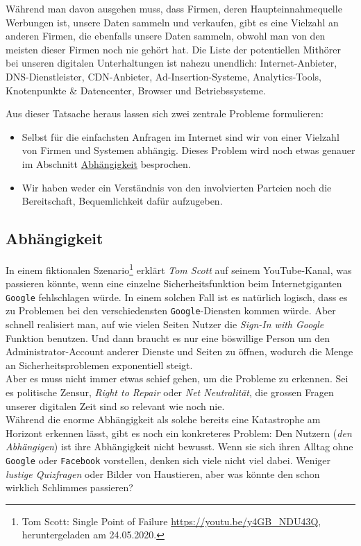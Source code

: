 \documentclass[a4paper,11pt,titlepage,twoside]{memoir}
\begin{document}
\noindent Während man davon ausgehen muss, dass Firmen, deren
Haupteinnahmequelle Werbungen ist, unsere Daten sammeln und verkaufen,
gibt es eine Vielzahl an anderen Firmen, die ebenfalls unsere Daten
sammeln, obwohl man von den meisten dieser Firmen noch nie gehört hat.
Die Liste der potentiellen Mithörer bei unseren digitalen
Unterhaltungen ist nahezu unendlich: Internet-Anbieter,
DNS-Dienstleister, CDN-Anbieter, Ad-Insertion-Systeme,
Analytics-Tools, Knotenpunkte \& Datencenter, Browser und
Betriebssysteme.

\noindent Aus dieser Tatsache heraus lassen sich zwei zentrale
Probleme formulieren:
\begin{itemize}
\item Selbst für die einfachsten Anfragen im Internet sind wir von einer
Vielzahl von Firmen und Systemen abhängig. Dieses Problem wird noch
etwas genauer im Abschnitt \hyperref[sec:org6f26883]{Abhängigkeit} besprochen.
\item Wir haben weder ein Verständnis von den involvierten Parteien noch
die Bereitschaft, Bequemlichkeit dafür aufzugeben.
\end{itemize}
\subsection{Abhängigkeit}
\label{sec:org6f26883}
In einem fiktionalen Szenario\footnote{Tom Scott: Single Point of Failure
\url{https://youtu.be/y4GB\_NDU43Q}, heruntergeladen am 24.05.2020.} erklärt \emph{Tom Scott} auf seinem
YouTube-Kanal, was passieren könnte, wenn eine einzelne
Sicherheitsfunktion beim Internetgiganten \texttt{Google} fehlschlagen würde.
In einem solchen Fall ist es natürlich logisch, dass es zu Problemen
bei den verschiedensten \texttt{Google}-Diensten kommen würde. Aber schnell
realisiert man, auf wie vielen Seiten Nutzer die \emph{Sign-In with Google}
Funktion benutzen. Und dann braucht es nur eine böswillige Person um
den Administrator-Account anderer Dienste und Seiten zu öffnen,
wodurch die Menge an Sicherheitsproblemen exponentiell steigt.\\

\noindent Aber es muss nicht immer etwas schief gehen, um die Probleme
zu erkennen. Sei es politische Zensur, \emph{Right to Repair} oder \emph{Net
Neutralität}, die grossen Fragen unserer digitalen Zeit sind so
relevant wie noch nie.\\

\noindent Während die enorme Abhängigkeit als solche bereits eine
Katastrophe am Horizont erkennen lässt, gibt es noch ein konkreteres
Problem: Den Nutzern (\emph{den Abhängigen}) ist ihre Abhängigkeit nicht
bewusst. Wenn sie sich ihren Alltag ohne \texttt{Google} oder \texttt{Facebook}
vorstellen, denken sich viele nicht viel dabei. Weniger \emph{lustige
Quizfragen} oder Bilder von Haustieren, aber was könnte den schon
wirklich Schlimmes passieren?\\
\end{document}
